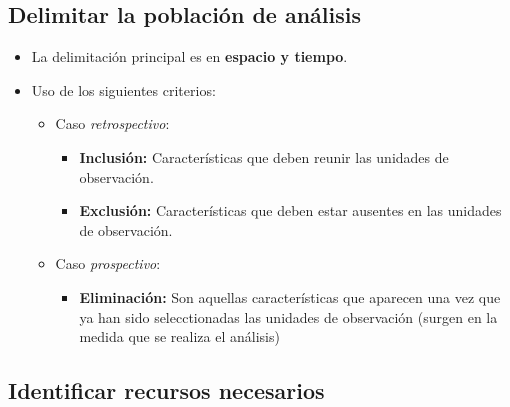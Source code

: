\documentclass[
]{book}
\providecommand{\tightlist}{%
  \setlength{\itemsep}{0pt}\setlength{\parskip}{0pt}}
\begin{document}
\hypertarget{delimitar-la-poblaciuxf3n-de-anuxe1lisis}{%
\subsection{Delimitar la población de análisis}\label{delimitar-la-poblaciuxf3n-de-anuxe1lisis}}

\begin{itemize}
\tightlist
\item
  La delimitación principal es en \textbf{espacio y tiempo}.
\item
  Uso de los siguientes criterios:

  \begin{itemize}
  \tightlist
  \item
    Caso \emph{retrospectivo}:

    \begin{itemize}
    \tightlist
    \item
      \textbf{Inclusión:} Características que deben reunir
      las unidades de observación.
    \item
      \textbf{Exclusión:} Características que deben estar
      ausentes en las unidades de observación.
    \end{itemize}
  \item
    Caso \emph{prospectivo}:

    \begin{itemize}
    \tightlist
    \item
      \textbf{Eliminación:} Son aquellas características
      que aparecen una vez que ya han sido selecctionadas
      las unidades de observación (surgen en la medida
      que se realiza el análisis)
    \end{itemize}
  \end{itemize}
\end{itemize}

\hypertarget{identificar-recursos-necesarios}{%
\subsection{Identificar recursos necesarios}\label{identificar-recursos-necesarios}}
\end{document}
